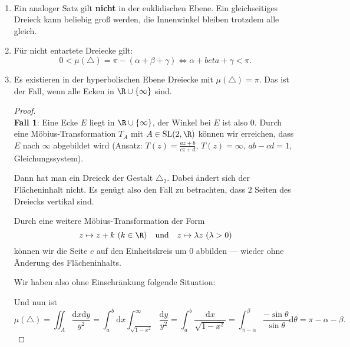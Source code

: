 \begin{remark}
  \ 
  \begin{enumerate}
    \item Ein analoger Satz gilt \textbf{nicht} in der euklidischen Ebene. Ein gleichseitiges Dreieck kann beliebig groß werden, die Innenwinkel bleiben trotzdem alle gleich.
    \item Für nicht entartete Dreiecke gilt:
    \begin{equation*}
      0 < \mu(\triangle) = \pi - (\alpha + \beta + \gamma) \Leftrightarrow \alpha + beta + \gamma < \pi\text{.}
    \end{equation*}
    \item Es existieren in der hyperbolischen Ebene Dreiecke mit \( \mu(\triangle) = \pi \). Das ist der Fall, wenn alle Ecken in \( \R \cup \left \{ \infty \right \} \) sind.
    \begin{proof}
      \ \\ 
      \textbf{Fall 1}: Eine Ecke \( E \) liegt in \( \R \cup \left \{ \infty \right \} \), der Winkel bei \( E \) ist also \(  0 \). Durch eine Möbius-Transformation \( T_A \) mit \( A \in \text{SL}(2,\R) \) können wir erreichen, dass \( E \) nach \( \infty \) abgebildet wird (Ansatz: \( T(z) = \frac{az + b}{cz + d} \), \( T(z) = \infty \), \( ab - cd = 1 \), Gleichungssystem).

      Dann hat man ein Dreieck der Gestalt \( \triangle_2 \). Dabei ändert sich der Flächeninhalt nicht. Es genügt also den Fall zu betrachten, dass \( 2 \) Seiten des Dreiecks vertikal sind.

      Durch eine weitere Möbius-Transformation der Form
      \begin{equation*}
        z \mapsto z + k \ (k \in \R) \quad \text{und} \quad z \mapsto \lambda z \ (\lambda > 0)
      \end{equation*}
      können wir die Seite \( c \) auf den Einheitskreis um \( 0 \) abbilden --- wieder ohne Änderung des Flächeninhalts.

      Wir haben also ohne Einschränkung folgende Situation:


      Und nun ist
      \begin{equation*}
        \mu(\triangle) = \iint_A \frac{\text{d}x\text{d}y}{y^2} = \int_a^b \text{d}x \int_{\sqrt{1-x^2}}^\infty \frac{\text{d}y}{y^2} = \int_a^b \frac{\text{d}x}{\sqrt{1-x^2}} = \int_{\pi - \alpha}^\beta \frac{-\sin \theta}{\sin \theta}\text{d}\theta = \pi - \alpha - \beta\text{.}
      \end{equation*}


\end{proof}
\end{enumerate}
\end{remark}
